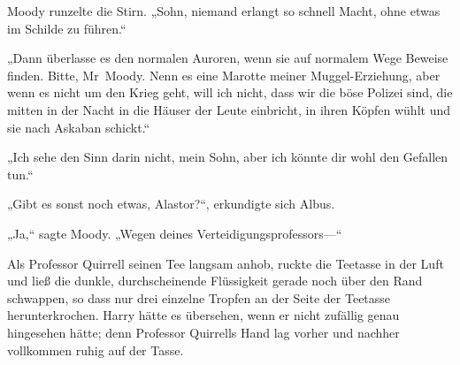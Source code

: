 Moody runzelte die Stirn. „Sohn, niemand erlangt so schnell Macht, ohne etwas im Schilde zu führen.“

„Dann überlasse es den normalen Auroren, wenn sie auf normalem Wege Beweise finden. Bitte, Mr~Moody. Nenn es eine Marotte meiner Muggel-Erziehung, aber wenn es nicht um den Krieg geht, will ich nicht, dass wir die böse Polizei sind, die mitten in der Nacht in die Häuser der Leute einbricht, in ihren Köpfen wühlt und sie nach Askaban schickt.“

„Ich sehe den Sinn darin nicht, mein Sohn, aber ich könnte dir wohl den Gefallen tun.“

„Gibt es sonst noch etwas, Alastor?“, erkundigte sich Albus.

„Ja,“ sagte Moody. „Wegen deines Verteidigungsprofessors—“



Als Professor Quirrell seinen Tee langsam anhob, ruckte die Teetasse in der Luft und ließ die dunkle, durchscheinende Flüssigkeit gerade noch über den Rand schwappen, so dass nur drei einzelne Tropfen an der Seite der Teetasse herunterkrochen.
Harry hätte es übersehen, wenn er nicht zufällig genau hingesehen hätte; denn Professor Quirrells Hand lag vorher und nachher vollkommen ruhig auf der Tasse.

